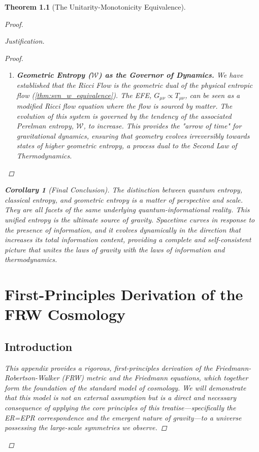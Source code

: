 \documentclass[11pt, letterpaper]{report}
\theoremstyle{plain} %
\newtheorem{theorem}{Theorem}[chapter]
\newtheorem{corollary}[theorem]{Corollary}
\theoremstyle{definition} %
\theoremstyle{remark} %
\begin{document}
\begin{theorem}[The Unitarity-Monotonicity Equivalence]
\begin{proof}
\begin{proof}[Justification]
\begin{proof}
\begin{enumerate}
    \item \textbf{Geometric Entropy ($\mathcal{W}$) as the Governor of Dynamics.} We have established that the Ricci Flow is the geometric dual of the physical entropic flow (\cref{thm:svn_w_equivalence}). The EFE, $G_{\mu\nu} \propto T_{\mu\nu}$, can be seen as a modified Ricci flow equation where the flow is sourced by matter. The evolution of this system is governed by the tendency of the associated Perelman entropy, $\mathcal{W}$, to increase. This provides the "arrow of time" for gravitational dynamics, ensuring that geometry evolves irreversibly towards states of higher geometric entropy, a process dual to the Second Law of Thermodynamics.
\end{enumerate}
\end{proof}

\begin{corollary}[Final Conclusion]
The distinction between quantum entropy, classical entropy, and geometric entropy is a matter of perspective and scale. They are all facets of the same underlying quantum-informational reality. This unified entropy is the ultimate source of gravity. Spacetime curves in response to the presence of information, and it evolves dynamically in the direction that increases its total information content, providing a complete and self-consistent picture that unites the laws of gravity with the laws of information and thermodynamics.
\end{corollary}


\appendix
\chapter{First-Principles Derivation of the FRW Cosmology}
\label{app:frw_derivation}

\section{Introduction}

This appendix provides a rigorous, first-principles derivation of the Friedmann-Robertson-Walker (FRW) metric and the Friedmann equations, which together form the foundation of the standard model of cosmology. We will demonstrate that this model is not an external assumption but is a direct and necessary consequence of applying the core principles of this treatise—specifically the ER=EPR correspondence and the emergent nature of gravity—to a universe possessing the large-scale symmetries we observe.


\end{proof}
\end{proof}
\end{theorem}
\end{document}
